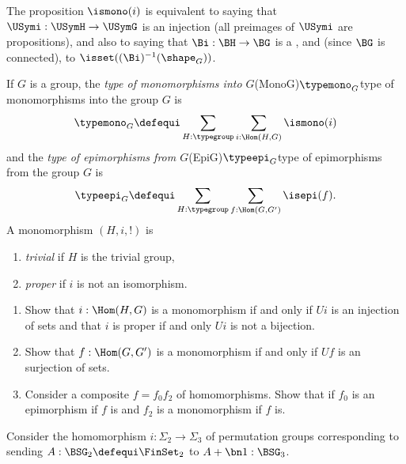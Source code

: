 The proposition $\ismono(i)$ is equivalent to saying that $\USymi:\USymH\to \USymG$ is an injection (all preimages of $\USymi$ are propositions), and also to saying that $\Bi:\BH\to\BG$ is a \covering, and (since $\BG$ is connected), to $\isset((\Bi)^{-1}(\shape_G))$.
\begin{definition}
  \label{def:typeofmono}
  If $G$ is a group, the \emph{type of monomorphisms into $G$}\glossary(MonoG){$\protect{\typemono_G}$}{type of monomorphisms into the group $G$} is
  $$\typemono_G\defequi\sum_{H:\typegroup}\sum_{i:\Hom(H,G)}\ismono(i)$$
  and the \emph{type of epimorphisms from $G$}\glossary(EpiG){$\protect{\typeepi_G}$}{type of epimorphisms from the group $G$} is
  $$\typeepi_G\defequi\sum_{H:\typegroup}\sum_{f:\Hom(G,G')}\isepi(f).$$
  A monomorphism $(H,i,!)$ is
      \begin{enumerate}
      \item \emph{trivial} if $H$ is the trivial group, %
      \item \emph{proper} if $i$ is not an isomorphism.\qedhere
      \end{enumerate}
    \end{definition}
    \begin{exercise}
      \begin{enumerate}
      \item Show that $i:\Hom(H,G)$ is a monomorphism if and only if $Ui$ is an injection of sets and that $i$ is proper if and only $Ui$ is not a bijection.
      \item Show that $f:\Hom(G,G')$ is a monomorphism if and only if $Uf$ is an surjection of sets.
      \item Consider a composite $f=f_0f_2$ of homomorphisms.  Show that if $f_0$ is an epimorphism if $f$ is and $f_2$ is a monomorphism if $f$ is.\qedhere
      \end{enumerate}

      
    \end{exercise}

\begin{example}
  \label{ex:sigma2inSigma3}
Consider the  homomorphism $i:\Sigma_2\to\Sigma_3$ of permutation groups corresponding to sending $A:\BSG_2\defequi \FinSet_2$ to $A+\bn1:\BSG_3$.
\end{example}

